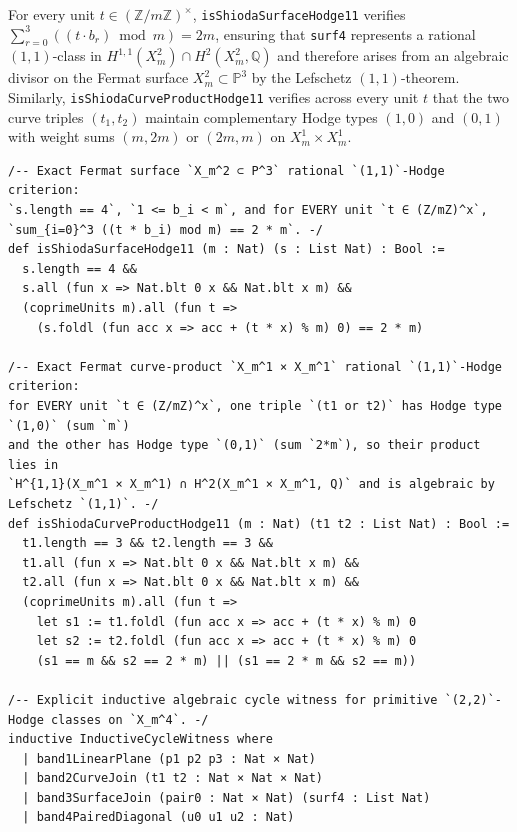 \documentclass[11pt,a4paper]{article}
\begin{document}
For every unit $t \in (\mathbb{Z}/m\mathbb{Z})^\times$, \texttt{isShiodaSurfaceHodge11} verifies $\sum_{r=0}^3 ((t \cdot b_r) \bmod m) = 2m$, ensuring that \texttt{surf4} represents a rational $(1,1)$-class in $H^{1,1}(X_m^2) \cap H^2(X_m^2, \mathbb{Q})$ and therefore arises from an algebraic divisor on the Fermat surface $X_m^2 \subset \mathbb{P}^3$ by the Lefschetz $(1,1)$-theorem. Similarly, \texttt{isShiodaCurveProductHodge11} verifies across every unit $t$ that the two curve triples $(t_1, t_2)$ maintain complementary Hodge types $(1,0)$ and $(0,1)$ with weight sums $(m, 2m)$ or $(2m, m)$ on $X_m^1 \times X_m^1$.

\begin{lstlisting}[caption={Surface Lefschetz $(1,1)$, curve-product $(1,1)$, witness datatype, and round-trip certificates in \texttt{ShiodaInductiveCycleSynthesis.lean}.}]
/-- Exact Fermat surface `X_m^2 ⊂ P^3` rational `(1,1)`-Hodge criterion:
`s.length == 4`, `1 <= b_i < m`, and for EVERY unit `t ∈ (Z/mZ)^x`,
`sum_{i=0}^3 ((t * b_i) mod m) == 2 * m`. -/
def isShiodaSurfaceHodge11 (m : Nat) (s : List Nat) : Bool :=
  s.length == 4 &&
  s.all (fun x => Nat.blt 0 x && Nat.blt x m) &&
  (coprimeUnits m).all (fun t =>
    (s.foldl (fun acc x => acc + (t * x) % m) 0) == 2 * m)

/-- Exact Fermat curve-product `X_m^1 × X_m^1` rational `(1,1)`-Hodge criterion:
for EVERY unit `t ∈ (Z/mZ)^x`, one triple `(t1 or t2)` has Hodge type `(1,0)` (sum `m`)
and the other has Hodge type `(0,1)` (sum `2*m`), so their product lies in
`H^{1,1}(X_m^1 × X_m^1) ∩ H^2(X_m^1 × X_m^1, Q)` and is algebraic by Lefschetz `(1,1)`. -/
def isShiodaCurveProductHodge11 (m : Nat) (t1 t2 : List Nat) : Bool :=
  t1.length == 3 && t2.length == 3 &&
  t1.all (fun x => Nat.blt 0 x && Nat.blt x m) &&
  t2.all (fun x => Nat.blt 0 x && Nat.blt x m) &&
  (coprimeUnits m).all (fun t =>
    let s1 := t1.foldl (fun acc x => acc + (t * x) % m) 0
    let s2 := t2.foldl (fun acc x => acc + (t * x) % m) 0
    (s1 == m && s2 == 2 * m) || (s1 == 2 * m && s2 == m))

/-- Explicit inductive algebraic cycle witness for primitive `(2,2)`-Hodge classes on `X_m^4`. -/
inductive InductiveCycleWitness where
  | band1LinearPlane (p1 p2 p3 : Nat × Nat)
  | band2CurveJoin (t1 t2 : Nat × Nat × Nat)
  | band3SurfaceJoin (pair0 : Nat × Nat) (surf4 : List Nat)
  | band4PairedDiagonal (u0 u1 u2 : Nat)


\end{lstlisting}
\end{document}
